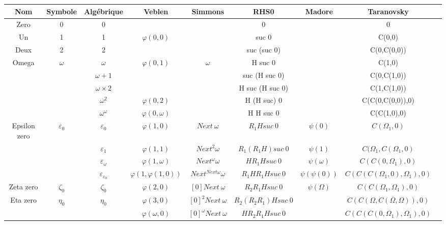 \documentclass[8pt]{article}
\begin{document}
\begin{tabular}{|c|c|c|c|c|c|c|c|c|}
\hline
Nom		& Symbole		& Algébrique			& Veblen			& Simmons			& RHS0		& Madore				& Taranovsky 			\\
\hline
Zero		& 0			& 0				& 				& 				& 0			& 					& 0				\\ \hline
Un		& 1			& 1				& \(\varphi(0,0)\)		& 				& suc 0			& 					& C(0,0)			\\ \hline
Deux		& 2			& 2				& 				& 				& suc (suc 0)		& 					& C(0,C(0,0))			\\ \hline
Omega		& \(\omega\)		& \(\omega\)			& \(\varphi(0,1)\)		& \(\omega\)			& H suc 0		& 					& C(1,0)			\\ \hline
		& 			& \(\omega+1\)			& 				& 				& suc (H suc 0)		& 					& C(0,C(1,0))			\\ \hline
		&			& \(\omega\times2\)		&				& 				& H suc (H suc 0)	& 					& C(1,C(1,0))			\\ \hline
		&			& \(\omega^2\)			& \(\varphi(0,2)\)		& 				& H (H suc) 0		& 					& C(C(0,C(0,0)),0)		\\ \hline
		&			& \(\omega^\omega\)		& \(\varphi(0,\omega)\)		& 				& H H suc 0		& 					& C(C(1,0),0)			\\ \hline
Epsilon zero	& \(\varepsilon_0\)	& \(\varepsilon_0\)		& \(\varphi(1,0)\)		& \(Next\ \omega\)		& \(R_1 H suc\ 0\)	& \(\psi(0)\)				& \(C(\Omega_1,0)\)		\\ \hline
		& 			& \(\varepsilon_1\)		& \(\varphi(1,1)\)		& \(Next^2 \omega\)	& \(R_1 (R_1 H) suc\ 0\)& \(\psi(1)\)				& \(C(\Omega_1,C(\Omega_1,0)\)	\\ \hline
		& 			& \(\varepsilon_\omega\)	& \(\varphi(1,\omega)\) 	& \(Next^\omega \omega\) & \(H R_1 H suc\ 0\)	& \(\psi(\omega)\)			& \(C(C(0,\Omega_1),0)\)	\\ \hline
		& 			&\(\varepsilon_{\varepsilon_0}\)& \(\varphi(1,\varphi(1,0))\)	& \(Next^{Next \omega} \omega \) & \(R_1 H R_1 H suc\ 0\)& \(\psi(\psi(0))\)			& \(C(C(C(\Omega_1,0),\Omega_1),0)\)\\ \hline
Zeta zero	& \(\zeta_0\)		& \(\zeta_0\)			& \(\varphi(2,0)\)		& \([0] Next\ \omega\)		& \(R_2 R_1 H suc\ 0\)	& \(\psi(\Omega)\)			& \(C(C(\Omega_1,\Omega_1),0)\)	\\ \hline
Eta zero	& \(\eta_0\)		& \(\eta_0\)			& \(\varphi(3,0)\)		& \([0]^2 Next\ \omega\) 	& \(R_2 (R_2 R_1) H suc\ 0\)&					& \(C(C(\Omega,C(\Omega,\Omega)),0)\) \\ \hline
		&			&			& \(\varphi(\omega,0)\)		& \([0]^\omega Next\ \omega\) & \(H R_2 R_1 H suc\ 0\)&					& \(C(C(C(0,\Omega_1),\Omega_1),0)\) \\ \hline

\end{tabular}
\end{document}
